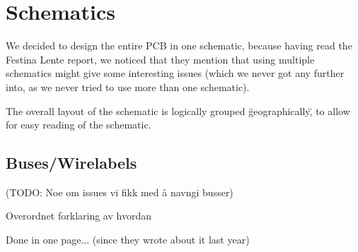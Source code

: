 \section {Schematics}

We decided to design the entire PCB in one schematic, because having read
the Festina Lente report, we noticed that they mention that using multiple schematics
might give some interesting issues (which we never got any further into,
as we never tried to use more than one schematic).

The overall layout of the schematic is logically grouped \"geographically\", to
allow for easy reading of the schematic.

\subsection {Buses/Wirelabels}
(TODO: Noe om issues vi fikk med å navngi busser)

Overordnet forklaring av hvordan

Done in one page... (since they wrote about it last year)
